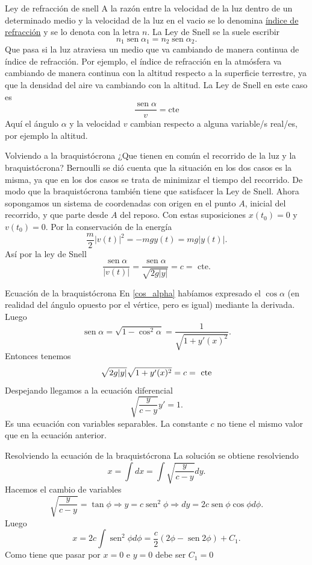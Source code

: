\documentclass[handout,hyperref={colorlinks=true}]{beamer}
\DeclareMathOperator{\sen}{sen}
\newcommand{\nl}{\onslide<+-> }
\begin{document}
\begin{frame}{Ley de refracción de snell}
\nl A la razón entre la velocidad de la luz dentro de un determinado medio y la velocidad de la luz en el vacio se lo denomina 
\href{http://es.wikipedia.org/wiki/Índice_de_refracción}{índice de refracción} y se lo denota con la letra $n$. La Ley de Snell se la suele escribir
\[\boxed{n_1\sen\alpha_1=n_2\sen\alpha_2 }.\]
Que pasa si la luz atraviesa un medio que va cambiando de manera continua de índice de refracción. Por ejemplo, el índice de refracción en la atmósfera
va cambiando de manera continua con la altitud respecto a la superficie terrestre, ya que la densidad del aire va cambiando con la altitud. La Ley de
Snell en este caso es
\[\boxed{\frac{\sen\alpha}{v}=\text{cte}}\]
Aquí el ángulo $\alpha$ y la velocidad $v$ cambian respecto a alguna variable/s real/es, por ejemplo la altitud.

\end{frame}


\begin{frame}{Volviendo a la braquistócrona}
\nl¿Que tienen en común el recorrido de la luz y la braquistócrona? Bernoulli se dió cuenta que la situación en los dos casos es la misma, ya que en los dos casos 
se trata de minimizar el tiempo del recorrido. De modo que la braquistócrona también tiene que satisfacer la Ley de Snell.\newline  
\nl Ahora sopongamos un sistema de coordenadas con origen en el punto $A$, inicial del recorrido, y que parte desde $A$   
del reposo. Con estas suposiciones $x(t_0)=0$ y $v(t_0)=0$. Por la conservación de la energía 
\[\frac{m}{2}|v(t)|^2=-mgy(t)=mg|y(t)|.\]
\nl Así por la ley de Snell
\[\frac{\sen\alpha}{|v(t)|}=\frac{\sen\alpha}{\sqrt{2g|y|}}=c=\text{ cte}.\]

  \end{frame}

\begin{frame}{Ecuación de la braquistócrona}
En \eqref{cos_alpha} habíamos expresado el $\cos\alpha$ (en realidad del ángulo opuesto por el vértice, pero es igual) mediante la derivada. Luego
\[\sen\alpha=\sqrt{1-\cos^2\alpha}=\frac{1}{\sqrt{1+y'(x)^2}}.\]
Entonces tenemos
\[\sqrt{2g|y|}\sqrt{1+y'(x)^2}=c=\hbox{ cte}\]
Despejando llegamos a la ecuación diferencial
\[\boxed{\sqrt{\frac{y}{c-y}}y'=1}.\]
Es una ecuación con variables separables. La constante $c$ no tiene el mismo valor que en la ecuación anterior.  
  \end{frame}

  \begin{frame}{Resolviendo la ecuación de la braquistócrona}
La solución se obtiene resolviendo
\[x=\int dx=\int \sqrt{\frac{y}{c-y}}dy.\]
Hacemos el cambio de variables
\[\sqrt{\frac{y}{c-y}}=\tan\phi\Longrightarrow y=c\sen^2\phi\Longrightarrow dy=2c\sen\phi\cos\phi d\phi.\]
Luego
\[x=2c\int\sen^2\phi d\phi=\frac{c}{2}\left(2\phi-\sen 2\phi\right)+C_1.\]
Como tiene que pasar por $x=0$ e $y=0$ debe ser $C_1=0$

  \end{frame}
\end{document}
